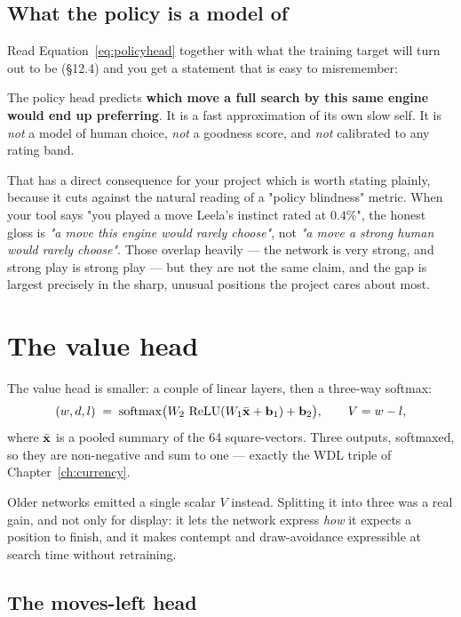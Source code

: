 \subsection{What the policy is a model of}

Read Equation~\eqref{eq:policyhead} together with what the training target will turn out to be
(§12.4) and you get a statement that is easy to misremember:

\begin{keyidea}
The policy head predicts \textbf{which move a full search by this same engine would end up
preferring}. It is a fast approximation of its own slow self. It is \emph{not} a model of
human choice, \emph{not} a goodness score, and \emph{not} calibrated to any rating band.
\end{keyidea}

That has a direct consequence for your project which is worth stating plainly, because it
cuts against the natural reading of a "policy blindness" metric. When your tool says "you
played a move Leela's instinct rated at $0.4\%$", the honest gloss is \emph{"a move this
engine would rarely choose"}, not \emph{"a move a strong human would rarely choose"}. Those
overlap heavily --- the network is very strong, and strong play is strong play --- but they
are not the same claim, and the gap is largest precisely in the sharp, unusual positions the
project cares about most.

\section{The value head}

The value head is smaller: a couple of linear layers, then a three-way softmax:
\begin{equation}
  \label{eq:valuehead}
  (w, d, l) \;=\; \operatorname{softmax}\bigl(W_2\,\operatorname{ReLU}(W_1 \bar{\mathbf{x}} + \mathbf{b}_1) + \mathbf{b}_2\bigr),
  \qquad V = w - l ,
\end{equation}
where $\bar{\mathbf{x}}$ is a pooled summary of the 64 square-vectors. Three outputs, softmaxed,
so they are non-negative and sum to one --- exactly the WDL triple of
Chapter~\ref{ch:currency}.

Older networks emitted a single scalar $V$ instead. Splitting it into three was a real gain,
and not only for display: it lets the network express \emph{how} it expects a position to
finish, and it makes contempt and draw-avoidance expressible at search time without
retraining.

\subsection{The moves-left head}

